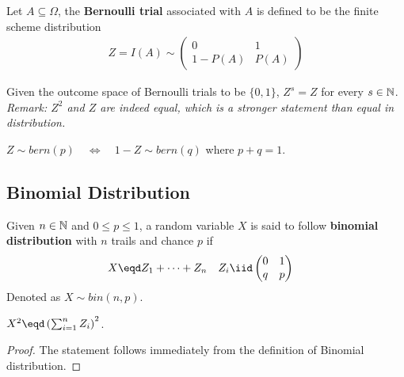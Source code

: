 \documentclass{article}
\begin{document}
   	\begin{remark}
   		Let $A \subseteq \Omega$, the \textbf{Bernoulli trial} associated with $A$ is defined to be the finite scheme distribution
   		\begin{align}
   			Z=I(A) \sim\left(\begin{array}{cc}{0} & {1} \\ {1-P(A)} & {P(A)}\end{array}\right)
   		\end{align}
   	\end{remark}
   	
   	\begin{proposition}[Invariance]
   		Given the outcome space of Bernoulli trials to be $\{0, 1\}$, $Z^s = Z$ for every $s \in \mathbb{N}$. \\
   		\emph{Remark: $Z^2$ and $Z$ are indeed equal, which is a stronger statement than equal in distribution.}
   	\end{proposition}
   	
   	\begin{proposition}[Negation]
   		$Z \sim bern(p) \quad \Leftrightarrow \quad 1-Z \sim bern(q)$ where $p + q = 1$.
   	\end{proposition}
   	
   	\subsection{Binomial Distribution}
   	\begin{definition}
   		Given $n \in \mathbb{N}$ and $0 \leq p \leq 1$, a random variable $X$ is said to follow \textbf{binomial distribution} with $n$ trails and chance $p$ if
   		\begin{align}
   			X &\eqd Z_1 + \cdots + Z_n\quad Z_i \iid  \begin{pmatrix}
   				0 & 1 \\ q & p
   			\end{pmatrix}
   		\end{align}
   		Denoted as $X \sim bin(n, p)$.
   	\end{definition}
   	
   	\begin{proposition}
   		$X^2 \eqd \left( \sum_{i=1}^n Z_i \right)^2$.
   	\end{proposition}
   	
   	\begin{proof}
   		The statement follows immediately from the definition of Binomial distribution.
   	\end{proof}
   	
\end{document}
